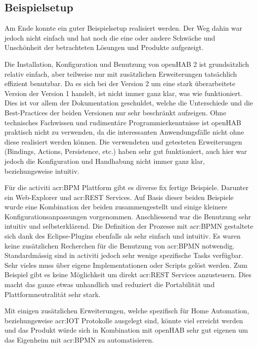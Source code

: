 \subsection{Beispielsetup}
Am Ende konnte ein guter Beispielsetup realisiert werden. Der Weg dahin war jedoch nicht einfach und hat noch die eine oder andere Schwäche und Unschönheit der betrachteten Lösungen und Produkte aufgezeigt.

Die Installation, Konfiguration und Benutzung von openHAB 2 ist grundsätzlich relativ einfach, aber teilweise nur mit zusätzlichen Erweiterungen tatsächlich effizient benutzbar. Da es sich bei der Version 2 um eine stark überarbeitete Version der Version 1 handelt, ist nicht immer ganz klar, was wie funktioniert. Dies ist vor allem der Dokumentation geschuldet, welche die Unterschiede und die Best-Practices der beiden Versionen nur sehr beschränkt aufzeigen. Ohne technisches Fachwissen und rudimentäre Programmierkenntnisse ist openHAB praktisch nicht zu verwenden, da die interessanten Anwendungsfälle nicht ohne diese realisiert werden können. Die verwendeten und getesteten Erweiterungen (Bindings, Actions, Persistence, etc.) haben sehr gut funktioniert, auch hier war jedoch die Konfiguration und Handhabung nicht immer ganz klar, beziehungsweise intuitiv.

Für die activiti \gls{acr:BPM} Plattform gibt es diverse fix fertige Beispiele. Darunter ein Web-Explorer und \gls{acr:REST} Services. Auf Basis dieser beiden Beispiele wurde eine Kombination der beiden zusammengestellt und einige kleinere Konfigurationsanpassungen vorgenommen. Anschliessend war die Benutzung sehr intuitiv und selbsterklärend. Die Definition der Prozesse mit \gls{acr:BPMN} gestaltete sich dank des Eclipse-Plugins ebenfalls als sehr einfach und intuitiv. Es waren keine zusätzlichen Recherchen für die Benutzung von \gls{acr:BPMN} notwendig. Standardmässig sind in activiti jedoch sehr wenige spezifische Tasks verfügbar. Sehr vieles muss über eigene Implementationen oder Scripts gelöst werden. Zum Beispiel gibt es keine Möglichkeit um direkt \gls{acr:REST} Services anzusteuern. Dies macht das ganze etwas unhandlich und reduziert die Portabilität und Plattformneutralität sehr stark.

Mit einigen zusätzlichen Erweiterungen, welche spezifisch für Home Automation, beziehungsweise \gls{acr:IOT} Protokolle ausgelegt sind, könnte viel erreicht werden und das Produkt würde sich in Kombination mit openHAB sehr gut eigenen um das Eigenheim mit \gls{acr:BPMN} zu automatisieren.


